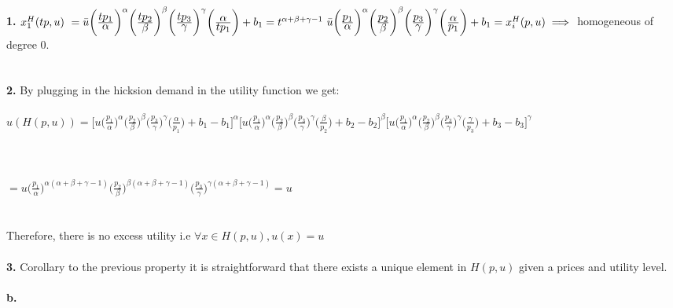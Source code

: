 \documentclass[12pt]{article}
\newenvironment{problem}[2][Problem]{\begin{trivlist}
\item[\hskip \labelsep {\bfseries #1}\hskip \labelsep {\bfseries #2.}]}{\end{trivlist}}
\newcommand\ddfrac[2]{\frac{\displaystyle #1}{\displaystyle #2}}
\begin{document}
\begin{problem}{5}
\\
\\
\textbf{1.} $x_1^H(t p, u) \text{ } =\bar{u} \bigg(\ddfrac{t p_1 }{ \alpha} \bigg)^{\alpha} \bigg(\ddfrac{ t p_2}{\beta } \bigg)^\beta   \bigg(\ddfrac{t p_3}{  \gamma } \bigg)^{\gamma} \bigg(\ddfrac{ \alpha}{ t p_1 } \bigg) + b_1 \\
\\
= t^{\alpha + \beta + \gamma -1} \text{ } \bar{u} \bigg(\ddfrac{ p_1 }{ \alpha} \bigg)^{\alpha} \bigg(\ddfrac{  p_2}{\beta } \bigg)^\beta   \bigg(\ddfrac{ p_3}{  \gamma } \bigg)^{\gamma} \bigg(\ddfrac{ \alpha}{  p_1 } \bigg) + b_1 =  x_i^H(p, u) \implies $  homogeneous of degree 0. 
\\
\\
\\
\textbf{2.} By plugging in the hicksion demand in the utility function we get: 
\\
\\
$u(H(p, u)) = \Bigg[u \bigg(\ddfrac{p_1 }{ \alpha} \bigg)^{\alpha} \bigg(\ddfrac{ p_2}{\beta } \bigg)^\beta   \bigg(\ddfrac{p_3}{  \gamma } \bigg)^{\gamma} \bigg(\ddfrac{ \alpha}{ p_1 } \bigg) + b_1  - b_1 \bigg]^\alpha \bigg[u \bigg(\ddfrac{p_1 }{ \alpha} \bigg)^{\alpha} \bigg(\ddfrac{ p_2}{\beta } \bigg)^\beta   \bigg(\ddfrac{p_3}{  \gamma } \bigg)^{\gamma} \bigg(\ddfrac{ \beta}{ p_2 } \bigg) + b_2  - b_2\bigg]^\beta \bigg[u \bigg(\ddfrac{p_1 }{ \alpha} \bigg)^{\alpha} \bigg(\ddfrac{ p_2}{\beta } \bigg)^\beta   \bigg(\ddfrac{p_3}{  \gamma } \bigg)^{\gamma} \bigg(\ddfrac{ \gamma}{ p_3 } \bigg) + b_3 - b_3\bigg]^\gamma$  
\\
\\
\\
\\
$= u \bigg(\ddfrac{p_1 }{ \alpha} \bigg)^{\alpha(\alpha + \beta + \gamma -1)} \bigg(\ddfrac{ p_2}{\beta } \bigg)^{\beta(\alpha + \beta + \gamma -1)}   \bigg(\ddfrac{p_3}{  \gamma } \bigg)^{\gamma(\alpha + \beta + \gamma -1)} = u$
\\
\\
\\
Therefore, there is no excess utility i.e $\forall x \in H(p, u), u(x) = u $
\\
\\
\textbf{3.} Corollary to the previous property it is straightforward that there exists a unique element in $H(p,u) $ given a prices and utility level. 
\\
\\
\textbf{b.} 
\\
\\

\end{problem}
\end{document}

